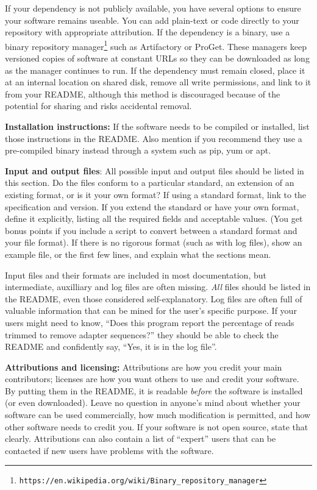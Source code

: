 \documentclass[10pt,letterpaper]{article}
\newcommand{\withurl}[2]{{#1}\footnote{\texttt{#2}}}
\begin{document}
If your dependency is not publicly available,
you have several options to ensure your software remains useable.
You can add plain-text or code directly to
your repository with appropriate attribution. If the dependency is a binary, use a
\withurl{binary repository manager}{https://en.wikipedia.org/wiki/Binary\_repository\_manager}
such as Artifactory or ProGet. These managers keep versioned copies of
software at constant URLs so they can be downloaded as long as the
manager continues to run. If the dependency must remain closed, place it at an
internal location on shared disk, remove all write permissions, and
link to it from your README, although this method is 
discouraged because of the potential for sharing and risks accidental removal.

\textbf{Installation instructions:} If the software needs to be compiled
or installed, list those instructions in the README. Also
mention if you recommend they use a pre-compiled binary instead
through a system such as pip, yum or apt.

\textbf{Input and output files}: All possible input and output files
should be listed in this section. Do the files conform to a particular
standard, an extension of an existing format, or is it your own
format? If using a standard format, link to the specification and
version. If you extend the standard or have your own format, define it
explicitly, listing all the required fields and acceptable values.
(You get bonus points if you include a script to convert between
a standard format and your file format). If there is no rigorous format
(such as with log files), show an example file, or the first few lines,
and explain what the sections mean.

Input files and their formats are included in most documentation, but
intermediate, auxilliary and log files are often missing. 
\emph{All} files should be listed in the README, even those considered self-explanatory. Log
files are often full of valuable information that can be
mined for the user's specific purpose. If your users might need to know,
``Does this program report the percentage of reads trimmed to remove
adapter sequences?'' they should be able to check the README and confidently
say, ``Yes, it is in the log file''.

\textbf{Attributions and licensing:} Attributions are how you credit
your main contributors; licenses are how you want others to use and
credit your software. By putting them in the README, it is readable \emph{before}
the software is installed (or even downloaded).
Leave no
question in anyone's mind about whether your software can be used
commercially, how much modification is permitted, and how other software
needs to credit you. If your software is not open source, state that clearly.
Attributions can also contain a list of ``expert'' users
that can be contacted if new users have problems with the software.
\end{document}
